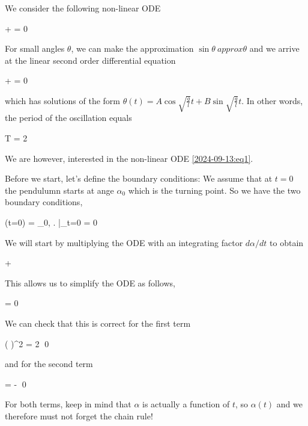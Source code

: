 

We consider the following non-linear ODE

\be\label{2024-09-13:eq1}
 +  \sin \theta = 0
\ee

For small angles $\theta$, we can make the approximation $\sin \theta \ approx \theta$ and we arrive at the linear second order differential equation

\bee
{} +  \theta = 0
\eee

which has solutions of the form $\theta(t) = A \cos \sqrt{\frac{g}{l}}t + B \sin \sqrt{\frac{g}{l}}t$. In other words, the period of the oscillation equals

\bee
T = 2 \pi {}
\eee

We are however, interested in the non-linear ODE \eqref{2024-09-13:eq1}.


Before we start, let's define the boundary conditions: We assume that at $t=0$ the pendulumn starts at ange $\alpha_0$ which is the turning point. So we have the two boundary conditions,

\be\label{2024-09-13:eq2}
\alpha(t=0) = \alpha_0, \quad \left. \right|_{t=0} = 0
\ee

We will start by multiplying the ODE with an integrating factor $d \alpha / dt$ to obtain

\bee
{}  +   \sin \alpha
\eee

This allows us to simplify the ODE as follows,

\bee
{}  = 0
\eee

We can check that this is correct for the first term

\bee
{}  \left( \right)^2 = 2    \qed
\eee

and for the second term

\bee
{}  \cos \alpha = - \sin \alpha {} \qed
\eee

For both terms, keep in mind that $\alpha$ is actually a function of $t$, so $\alpha(t)$ and we therefore must not forget the chain rule!

